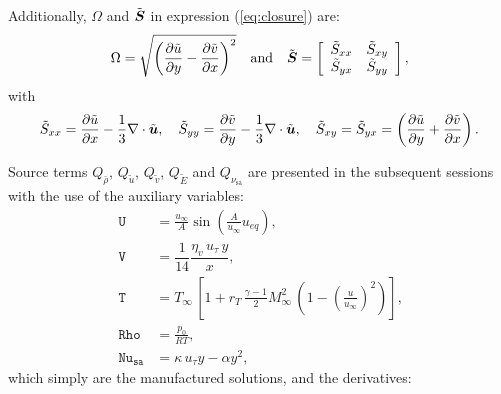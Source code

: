 \documentclass[10pt]{article}
\newcommand{\diff}[2] {\dfrac{\partial #1}{\partial #2}}
\newcommand{\bv}[1]{\ensuremath{\mbox{\boldmath$ #1 $}}}
\newcommand{\Rho}{\,\mathtt{Rho}}
\newcommand{\U}{\,\mathtt{U}}
\newcommand{\V}{\,\mathtt{V}}
\newcommand{\Nu}{\,\mathtt{Nu_{sa}}}
\newcommand{\T}{\,\mathtt{T}}
\newcommand{\sa}{\nu_{\mathrm{sa}}}
\newcommand{\brho}{\bar{\rho}}
\newcommand{\tu}{\tilde{u}}
\newcommand{\tv}{\tilde{v}}
\newcommand{\tS}{\tilde{S}}
\newcommand{\tE}{\tilde{E}}
\begin{document}
Additionally, $\Omega$ and $\tilde{\bv{S}}$ in expression (\ref{eq:closure}) are:
\begin{gather*}
\label{eq:closure03}
 \Omega = \sqrt{\left( \diff{\tilde{u}}{y} - \diff{\tilde{v}}{x}\right)^2} \quad \mbox{and}\quad 
\tilde{\bv{S}}=\left[
\begin{array}{cc}
\tS_{xx} & \tS_{xy}\\
\tS_{yx} & \tS_{yy}
\end{array}\right] , 
\end{gather*}
with
\begin{equation*}
\tS_{xx}= \diff{\tilde{u}}{x}-\dfrac{1}{3} \nabla \cdot \tilde{\bv{u}},\quad \tS_{yy}= \diff{\tilde{v}}{y}-\dfrac{1}{3} \nabla \cdot \tilde{\bv{u}}, \quad \tS_{xy}= \tS_{yx}= \left( \diff{\tilde{u}}{y} + \diff{\tilde{v}}{x}\right).\\
\end{equation*}




Source terms $Q_{\brho}$, $Q_{\tu}$, $Q_{\tv}$, $Q_{\tE}$ and $Q_{\sa}$ are presented in the subsequent sessions with the use of the auxiliary variables:
\begin{equation}
\label{eq:aux_2d}
\begin{split}
\U &= \frac{u_{\infty}}{A} \sin \left( \frac{A}{u_{\infty}} u_{eq} \right),\\
\V &= \dfrac{1}{14} \dfrac{\eta_v \,u_{\tau} \,y}{x},\\
\T &= T_{\infty} \,  \left[ 1 + r_T \, \frac{\gamma - 1}{2} M_{\infty}^2 \, \left( 1 - \left(\frac{u}{u_{\infty}}\right)^2 \right) \right],\\
\Rho &= \frac{p_0}{R T},\\
\Nu &= \kappa \,  u_{\tau} y - \alpha y^2,
\end{split}
\end{equation}
which simply are the manufactured solutions, and the derivatives: 
\end{document}
